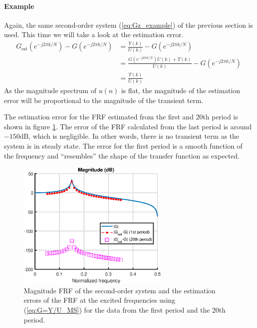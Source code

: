 \newpage
\paragraph{Example}
Again, the same second-order system (\ref{eq:Gz_example}) of the previous section is used. This time we will take a look at the estimation error.
\begin{align*}
    G_{\mathrm{est}}(e^{-j 2 \pi k/N}) - G(e^{-j 2 \pi k/N}) &= \frac{Y(k)}{U(k)} - G(e^{-j 2 \pi k/N}) \\ &=  \frac{G(e^{-j 2 \pi k/N}) U(k) + T(k)}{U(k)} - G(e^{-j 2 \pi k/N}) \\ &=  \frac{T(k)}{U(k)}
\end{align*}
As the magnitude spectrum of $u(n)$ is flat, the magnitude of the estimation error will be proportional to the magnitude of the transient term.

The estimation error for the FRF estimated from the first and 20th period is shown in figure \ref{fig:MS_G_transients}. The error of the FRF calculated from the last period is around $-150 \text{dB}$, which is negligible. In other words, there is no transient term as the system is in steady state. The error for the first period is a smooth function of the frequency and ``resembles'' the shape of the transfer function as expected.

\begin{figure}[H]
    \centering
    \includegraphics[width=0.65\textwidth]{figures/MS_G_transients.eps}
    \caption{Magnitude FRF of the second-order system and the estimation errors of the FRF at the excited frequencies using (\ref{eq:G=Y/U_MS}) for the data from the first period and the 20th period.}
    \label{fig:MS_G_transients}
\end{figure}

